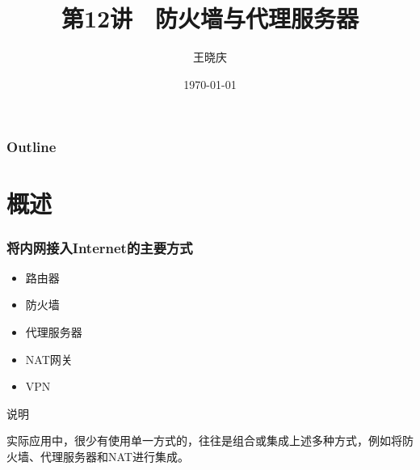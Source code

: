 \documentclass[xcolor=svgnames,presentation]{beamer}
\title{第12讲　防火墙与代理服务器}
\author{王晓庆}
\date{\today}
\institute{wangxiaoqing@outlook.com}
\begin{document}
\maketitle

\begin{frame}
\frametitle{Outline}
\setcounter{tocdepth}{1}
\tableofcontents
\end{frame}
\section{概述}
\label{sec-1}
\begin{frame}
\frametitle{将内网接入Internet的主要方式}
\label{sec-1-1}
\begin{itemize}

\item 路由器
\label{sec-1-1-1}%

\item 防火墙
\label{sec-1-1-2}%

\item 代理服务器
\label{sec-1-1-3}%

\item NAT网关
\label{sec-1-1-4}%

\item VPN
\label{sec-1-1-5}%
\end{itemize} %
\begin{exampleblock}{说明}
\label{sec-1-1-6}

实际应用中，很少有使用单一方式的，往往是组合或集成上述多种方式，例如将防火墙、代理服务器和NAT进行集成。
\end{exampleblock}
\end{frame}
\end{document}
